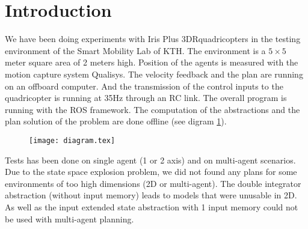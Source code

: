 \section{Introduction}
We have been doing experiments with Iris Plus 3DR\trademark quadricopters in the testing environment of the Smart Mobility Lab of KTH.
The environment is a $5\times5$ meter square area of 2 meters high.
Position of the agents is measured with the motion capture system Qualisys\trademark.
The velocity feedback and the plan are running on an offboard computer. And the transmission of the control inputs to the quadricopter is running at 35Hz through an RC link. The overall program is running with the ROS framework.
The computation of the abstractions and the plan solution of the problem are done offline (see digram \ref{diagram}).

\begin{figure}
\texttt{[image: diagram.tex]}
\label{diagram}
\end{figure}

Tests has been done on single agent (1 or 2 axis) and on multi-agent scenarios.
Due to the state space explosion problem, we did not found any plans for some environments of too high dimensions (2D or multi-agent).
The double integrator abstraction (without input memory) leads to models that were unusable in 2D. As well as the input extended state abstraction with 1 input memory could not be used with multi-agent planning.
